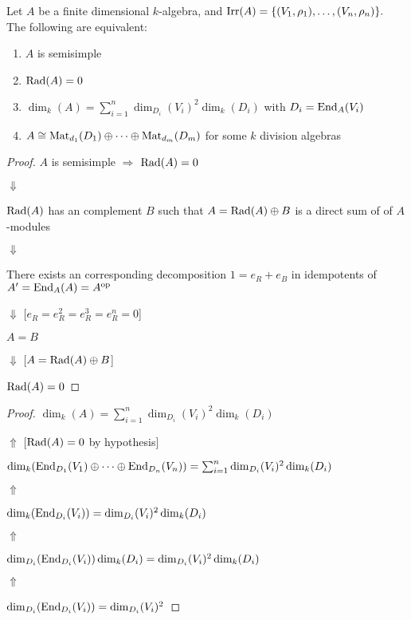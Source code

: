 \begin{thm}
Let \(A\) be a finite dimensional \(k\)-algebra, and \(\operatorname{Irr}(A)=\{(V_{1},\rho _{1}),\ldots ,(V_{n},\rho _{n})\}.\) The following are equivalent:

\begin{enumerate}
  \item \(A\) is semisimple
  \item \(\operatorname{Rad}(A)=0\)
  \item \(\dim_{k}(A)=\sum _{i=1}^n \dim_{D_{i}}(V_{i})^{2} \dim_{k}(D_{i})\) with \(D_{i}=\operatorname{End}_A(V_{i})\)
  \item \(A\cong \operatorname{Mat}_{d_{1}}(D_{1})\oplus \cdots \oplus \operatorname{Mat}_{d_{m}}(D_{m})\) for some \(k\) division algebras
\end{enumerate}
\end{thm}


\begin{proof}
\(A\) is semisimple \(\Longrightarrow \) \(\operatorname{Rad}(A)=0\)

\(\Downarrow \)

\(\operatorname{Rad}(A)\) has an complement \(B\) such that \(A=\operatorname{Rad}(A)\oplus B\) is a direct sum of of \(A\)-modules

\(\Downarrow \)

There exists an corresponding decomposition \(1=e_R+e_B\) in idempotents of \(A'=\operatorname{End}_A(A)=A^{\operatorname{op}}\)

\(\Downarrow \)  [\(e_R=e_R^2=e_R^3=e_R^n=0\)]

\(A=B\)

\(\Downarrow \) [\(A=\operatorname{Rad}(A)\oplus B\)]

\(\operatorname{Rad}(A)=0\)
\end{proof}

\begin{proof}
\(\dim_{k}(A)=\sum _{i=1}^n \dim_{D_{i}}(V_{i})^{2} \dim_{k}(D_{i})\)

\(\Uparrow \) [\(\operatorname{Rad}(A)=0\) by hypothesis]

\(\dim_{k}(\operatorname{End}_{D_{1}}(V_{1})\oplus \cdots \oplus \operatorname{End}_{D_{n}}(V_{n}))=\sum _{i=1}^n \dim_{D_{i}}(V_{i})^{2} \dim_{k}(D_{i})\)

\(\Uparrow \)

\(\dim_{k}(\operatorname{End}_{D_{i}}(V_{i}))= \dim_{D_{i}}(V_{i})^{2} \dim_{k}(D_{i})\)

\(\Uparrow \)

\(\dim_{D_{i}}(\operatorname{End}_{D_{i}}(V_{i}))\dim_{k}(D_{i}) =\dim_{D_{i}}(V_{i})^{2} \dim_{k}(D_{i})\)

\(\Uparrow \)

\(\dim_{D_{i}}(\operatorname{End}_{D_{i}}(V_{i})) =\dim_{D_{i}}(V_{i})^{2} \)

\end{proof}

